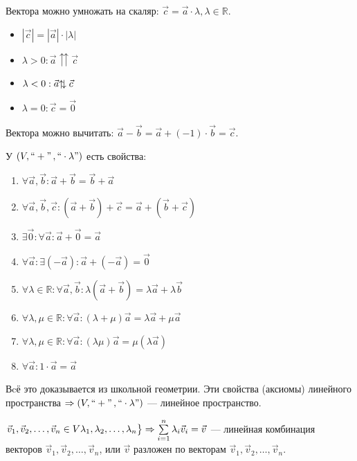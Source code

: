 \documentclass[twoside]{book}
\newcommand{\updownarrows}{\mathbin\uparrow\hspace{-.5em}\downarrow}
\begin{document}
Вектора можно умножать на скаляр: \(\vec c = \vec a \cdot \lambda, \lambda \in \mathbb R\).
\begin{itemize}
    \item[] \(|\vec c| = |\vec a| \cdot |\lambda|\)
    \item[] \(\lambda > 0: \vec a \upuparrows \vec c\)
    \item[] \(\lambda < 0: \vec a \updownarrows \vec c\)
    \item[] \(\lambda = 0: \vec c = \vec 0\)
\end{itemize}
Вектора можно вычитать: \(\vec a - \vec b = \vec a + (-1) \cdot \vec b = \vec c\).

У \((V, ``+" \,, ``\cdot \lambda")\) есть свойства:
\begin{enumerate}
    \item \(\forall \vec a, \vec b: \vec a + \vec b = \vec b + \vec a\)
    \item \(\forall \vec a, \vec b, \vec c: (\vec a + \vec b) + \vec c = \vec a + (\vec b + \vec c)\)
    \item \(\exists \vec 0: \forall \vec a: \vec a + \vec0 = \vec a\)
    \item \(\forall \vec a: \exists (- \vec a): \vec a+(- \vec a) = \vec 0\)
    \item \(\forall \lambda \in \mathbb R: \forall \vec a, \vec b: \lambda (\vec a + \vec b) = \lambda \vec a + \lambda \vec b\)
    \item \(\forall \lambda, \mu \in \mathbb R: \forall \vec a: (\lambda + \mu)\vec a = \lambda \vec a + \mu \vec a\)
    \item \(\forall \lambda, \mu \in \mathbb R: \forall \vec a: (\lambda \mu)\vec a = \mu(\lambda \vec a)\)
    \item \(\forall \vec a: 1 \cdot \vec a = \vec a\)
\end{enumerate}

Вcё это доказывается из школьной геометрии. Эти свойства (аксиомы) линейного пространства \(\Rightarrow (V, ``+" \,, ``\cdot \lambda")\) --- линейное пространство.

\(
\begin{rcases*}
    \vec v_1, \vec v_2, \dots, \vec v_n \in V
    \lambda_1, \lambda_2, \dots, \lambda_n
\end{rcases*}
\Rightarrow \sum\limits_{i = 1}^{n} \lambda_i \vec v_i = \vec v\) --- линейная комбинация векторов \(\vec v_1, \vec v_2, \dots, \vec v_n\), или \(\vec v\) разложен по векторам \(\vec v_1, \vec v_2, \dots, \vec v_n\).
\end{document}

